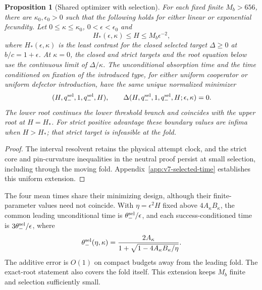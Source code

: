 \documentclass[aps,pre,reprint,amsmath,amssymb,longbibliography]{revtex4-2}
\newtheorem{proposition}[theorem]{Proposition}
\begin{document}
\begin{proposition}[Shared optimizer with selection]
\label{prop:v7-selected-time}
For each fixed finite $M_b>656$, there are $\kappa_0,\epsilon_0>0$
such that the following holds for either linear or exponential
fecundity. Let $0\le\kappa\le\kappa_0$, $0<\epsilon<\epsilon_0$
and
\begin{equation}
 H_*(\epsilon,\kappa)\le H\le M_b\epsilon^{-2},
 \label{eq:v7-selected-time-domain}
\end{equation}
where $H_*(\epsilon,\kappa)$ is the least contrast for the closed
selected target $\Delta\ge0$ at $b/c=1+\epsilon$.
At $\kappa=0$, the closed and strict targets and the root equation
below use the continuous limit of $\Delta/\kappa$. The unconditional absorption time and the time conditioned
on fixation of the introduced type, for either uniform cooperator
or uniform defector introduction, have the same unique normalized
minimizer
\begin{equation}
 (H,q_-^{\rm sel},1,q_-^{\rm sel},H),\qquad
 \Delta(H,q_-^{\rm sel},1,q_-^{\rm sel},H;\epsilon,\kappa)=0.
 \label{eq:v7-selected-time-root}
\end{equation}
The lower root continues the lower threshold branch and coincides
with the upper root at $H=H_*$. For strict positive advantage these
boundary values are infima when $H>H_*$; that strict target is
infeasible at the fold.
\end{proposition}
\begin{proof}
The interval resolvent
retains the physical attempt clock, and the strict core and
pin-curvature inequalities in the neutral proof persist at small
selection, including through the moving fold.
Appendix~\ref{app:v7-selected-time} establishes this uniform
extension.
\end{proof}

The four mean times share their minimizing design, although their
finite-parameter values need not coincide.
With $\eta=\epsilon^2H$ fixed above $4A_\kappa B_\kappa$,
the common leading unconditional time is
$\theta_-^{\rm sel}/\epsilon$, and each success-conditioned time is
$3\theta_-^{\rm sel}/\epsilon$, where
\begin{equation}
 \theta_-^{\rm sel}(\eta,\kappa)
 =\frac{2A_\kappa}
 {1+\sqrt{1-4A_\kappa B_\kappa/\eta}}.
 \label{eq:v7-selected-time-frontier}
\end{equation}
The additive error is $O(1)$ on compact budgets away from the leading
fold. The exact-root statement also covers the fold itself. This
extension keeps $M_b$ finite and selection sufficiently small.
\end{document}
